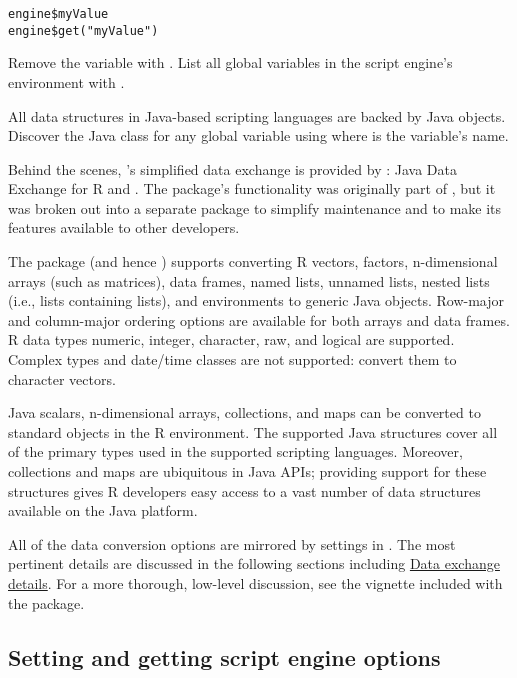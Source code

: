 \begin{verbatim}
engine$myValue
engine$get("myValue")
\end{verbatim}

Remove the  variable with . List all global variables in the script engine's environment with .

All data structures in Java-based scripting languages are backed by Java objects. Discover the Java class for any global variable using   where  is the variable's name.

Behind the scenes, 's simplified data exchange is provided by : Java Data Exchange for R and . The  package's functionality was originally part of , but it was broken out into a separate package to simplify maintenance and to make its features available to other developers.

The  package (and hence ) supports converting R vectors, factors, n-dimensional arrays (such as matrices), data frames, named lists, unnamed lists, nested lists (i.e., lists containing lists), and environments to generic Java objects. Row-major and column-major ordering options are available for both arrays and data frames. R data types numeric, integer, character, raw, and logical are supported. Complex types and date/time classes are not supported: convert them to character vectors.

Java scalars, n-dimensional arrays, collections, and maps can be converted to standard objects in the R environment. The supported Java structures cover all of the primary types used in the supported scripting languages. Moreover, collections and maps are ubiquitous in Java APIs; providing support for these structures gives R developers easy access to a vast number of data structures available on the Java platform.

All of the  data conversion options are mirrored by settings in . The most pertinent details are discussed in the following sections including \hyperlink{dataexchangedetails}{Data exchange details}. For a more thorough, low-level discussion, see the vignette included with the  package. 

\subsection{Setting and getting script engine options}

